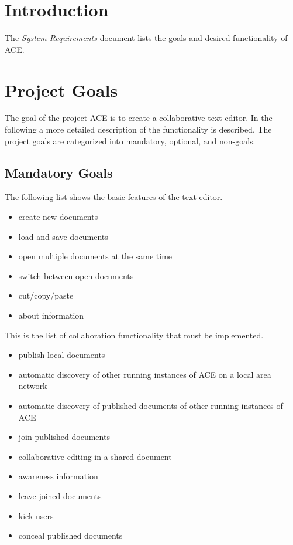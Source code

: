 \documentclass[11pt,a4paper]{article}
\begin{document}
\setlength{\parindent}{0pt}



\tableofcontents
\newpage


\section{Introduction}

The \emph{System Requirements} document lists the goals and desired 
functionality of ACE.


\section{Project Goals}

The goal of the project ACE is to create a collaborative text editor. In 
the following a more detailed description of the functionality is described.
The project goals are categorized into mandatory, optional, and non-goals.

\subsection{Mandatory Goals}
The following list shows the basic features of the text editor.
\begin{itemize}
 \item create new documents
 \item load and save documents
 \item open multiple documents at the same time
 \item switch between open documents
 \item cut/copy/paste
 \item about information
\end{itemize}

This is the list of collaboration functionality that must be implemented.
\begin{itemize}
 \item publish local documents
 \item automatic discovery of other running instances of ACE on a local area network
 \item automatic discovery of published documents of other running instances of ACE
 \item join published documents
 \item collaborative editing in a shared document
 \item awareness information
 \item leave joined documents
 \item kick users
 \item conceal published documents
\end{itemize}
\end{document}
